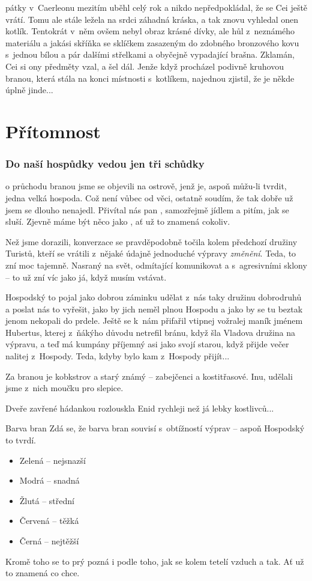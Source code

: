 \documentclass[a4paper,twocolumn,openany,nodeprecatedcode, justified]{dndbook}
\newcommand{\bi}{\begin{itemize}}
\newcommand{\ei}{\end{itemize}}
\begin{document}
	pátky v~Caerleonu mezitím uběhl celý rok a nikdo nepředpokládal, že se Cei ještě vrátí. Tomu ale stále ležela na srdci záhadná kráska, a tak znovu vyhledal onen kotlík. Tentokrát v~něm ovšem nebyl obraz krásné dívky, ale hůl z~neznámého materiálu a jakási skříňka se sklíčkem zasazeným do zdobného bronzového kovu s~jednou bílou a pár dalšími střelkami a obyčejně vypadající brašna. Zklamán, Cei si ony předměty vzal, a šel dál. Jenže když procházel podivně kruhovou branou, která stála na konci místnosti s~kotlíkem, najednou zjistil, že je někde úplně jinde...
	
	
	\part{Přítomnost}
	\section[Sezení 1]{Do naší hospůdky vedou jen tři schůdky}
	o průchodu branou jsme se objevili na ostrově, jenž je, aspoň můžu-li tvrdit, jedna velká hospoda. Což není vůbec od věci, ostatně soudím, že tak dobře už jsem se dlouho nenajedl. Přivítal nás pan , samozřejmě jídlem a pitím, jak se sluší. Zjevně máme být něco jako , ať už to znamená cokoliv.
	
	Než jsme dorazili, konverzace se pravděpodobně točila kolem předchozí družiny Turistů, kteří se vrátili z~nějaké údajně jednoduché výpravy \emph{změnění}. Teda, to zní moc tajemně. Nasraný na svět, odmítající komunikovat a s~agresivními sklony -- to už zní víc jako já, když musím vstávat.
	
	Hospodský to pojal jako dobrou záminku udělat z~nás taky družinu dobrodruhů a poslat nás to vyřešit, jako by jich neměl plnou Hospodu a jako by se tu beztak jenom nekopali do prdele. Ještě se k~nám přifařil vtipnej vožralej maník jménem Hubertus, kterej z~ňákýho důvodu netrefil bránu, když šla Vladova družina na výpravu, a teď má kumpány příjemný asi jako svojí starou, když přijde večer nalitej z~Hospody. Teda, kdyby bylo kam z~Hospody přijít...
	
	Za branou je kobkstrov a starý známý -- zabejčenci a kostitřasové. Inu, udělali jsme z~nich moučku pro slepice.
	
	Dveře zavřené hádankou rozlouskla Enid rychleji než já lebky kostlivců...
	
	\begin{DndSidebar}{Barva bran}
		\sffamily
		Zdá se, že barva bran souvisí s~obtížností výprav -- aspoň Hospodský to tvrdí.
		\bi
			\item Zelená -- nejsnazší
			\item Modrá -- snadná
			\item Žlutá -- střední
			\item Červená -- těžká
			\item Černá -- nejtěžší
		\ei
		Kromě toho se to prý pozná i podle toho, jak se kolem tetelí vzduch a tak. Ať už to znamená co chce.
	\end{DndSidebar}
	
\end{document}
